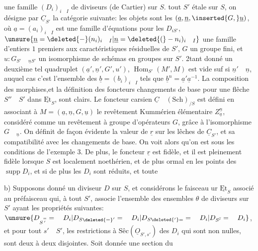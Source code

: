  une famille $(D_i)_{i\quad I}$ de diviseurs (de Cartier) sur $S$.  tout $S'$ étale sur $S$, on désigne par $\underline{C}_{S'}$ la catégorie suivante: les objets sont les   $(\underline{a},\underline{n},\inserted{G,}\underline{u})$, où $\underline{a}=(a_i)_{i\quad I}$ est une famille d'équations pour les $D_{iS'}$, $\unsure{\underline{n}=\deleted{-}(n_i)_{i\quad I}|\underline{n}=\deleted{(}-n_i)_{i\quad I}}$ une famille d'entiers $1$ premiers aux caractéristiques résiduelles de $S'$,  $G$ un groupe fini, et $u:G_{S'}\quad{}_{\underline{n}S'}$ un isomorphisme de schémas en groupes sur $S'$. 2tant donné un deuxième tel quadruplet  $(\underline{a}',\underline{n}',G',u')$,  $\operatorname{Hom}_{S'}(M',M)$ est vide suf si $\underline{n}'\quad\underline{n}$, auquel cas c'est l'ensemble des $\underline{b}=(b_i)_{i\quad I}$ tels que $\underline{b}^{n}=\underline{a}'\underline{a}^{-1}$. La composition des morphises,et la définition des foncteurs changements de base pour une flêche $S''\quad S'$ dans $\underline{\mathrm{Et}}_S$, sont clairs. Le foncteur carsien $\underline{C}\quad(\mathrm{Sch})_{/S}$ est défini en associant à $M=(\underline{a},\underline{n},G,\underline{u})$ le revêtement Kummérien élémentaire $Z_{\underline{a}}^{\underline{n}}$,   considéré comme un revêtement à groupe d'opérateurs $G$, grâce à l'isomorphisme $G\quad{}_{\underline{n}}$. On définit de façon évidente la valeur de $\underline{r}$ sur les lêches de $\underline{C}_{S'}$, et sa compatibilité avec les changements de base. On voit alors qu'on est sous les conditions de l'exemple 3. De plus, le foncteur $\underline{r}$ est fidèle, et il est pleinement fidèle lorsque $S$ est  localement noethérien, et de plus ormal en les points des $\operatorname{supp}D_i$, et si de plus les $D_i$ sont réduits, et toute 

b) Supposons donné un diviseur $D$ sur $S$,  et considérons le faisceau ur $\underline{\mathrm{Et}}_S$ associé au préfaisceau qui, à tout $S'$, associe l'ensemble des  ensembles   $\theta$ de diviseurs sur $S'$ ayant les propriétés suivantes: $\unsure{D_{S\overset{=}{'}}=\quad D_i|D_{S\deleted{=}'}=\quad D_i|D_{S\deleted{'}=} =\quad D_i|D_{S\bar{'}}=\quad D_i}$, et pour tout $s'\quad S'$, les restrictions  à $\text{Sêc}(\underline{O}_{S',s'})$ des $D_i$ qui sont non nulles, sont deux à deux disjointes. Soit donnée une section du
